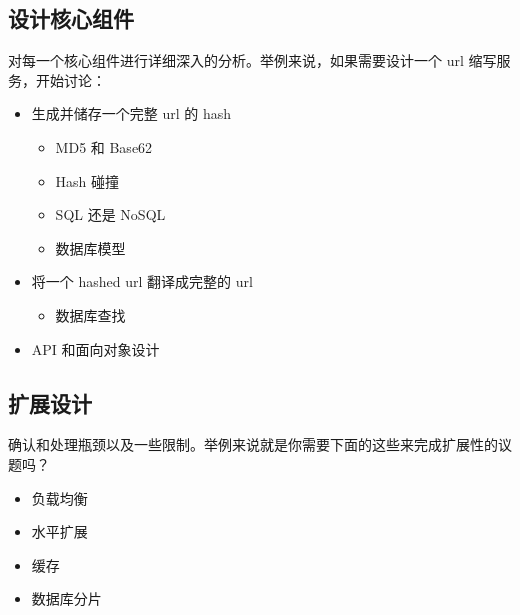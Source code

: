 \documentclass[12pt]{article}
\begin{document}
\subsection{设计核心组件}
对每一个核心组件进行详细深入的分析。举例来说，如果需要设计一个 url 缩写服务，开始讨论：
\begin{itemize}
\setlength{\itemsep}{0pt}
\setlength{\parsep}{0pt}
\setlength{\parskip}{0pt}
    \item 生成并储存一个完整 url 的 hash
	\begin{itemize}
	\setlength{\itemsep}{0pt}
	\setlength{\parsep}{0pt}
	\setlength{\parskip}{0pt}
    		\item MD5 和 Base62
    		\item Hash 碰撞
    		\item SQL 还是 NoSQL
		\item 数据库模型
	\end{itemize}
    \item 将一个 hashed url 翻译成完整的 url
	\begin{itemize}
	\setlength{\itemsep}{0pt}
	\setlength{\parsep}{0pt}
	\setlength{\parskip}{0pt}
    		\item 数据库查找
	\end{itemize}
     \item API 和面向对象设计
\end{itemize}

\subsection{扩展设计}
确认和处理瓶颈以及一些限制。举例来说就是你需要下面的这些来完成扩展性的议题吗？
\begin{itemize}
\setlength{\itemsep}{0pt}
\setlength{\parsep}{0pt}
\setlength{\parskip}{0pt}
    \item 负载均衡
    \item 水平扩展
    \item 缓存
    \item 数据库分片
\end{itemize}










\end{document}
